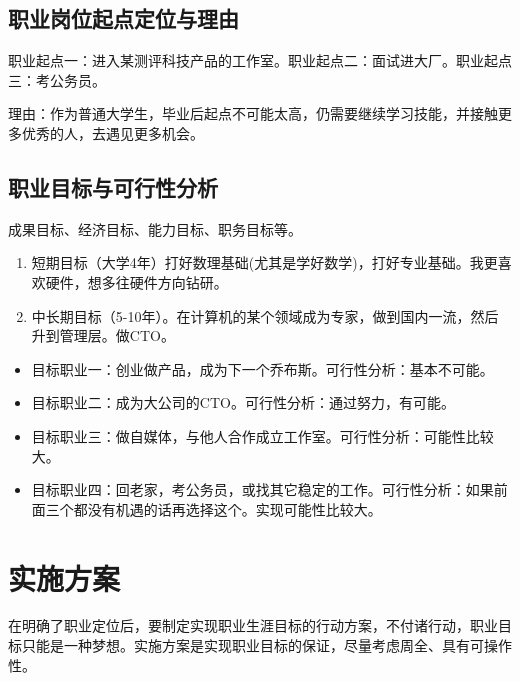 \documentclass{article}
\begin{document}
\subsection{职业岗位起点定位与理由}
职业起点一：进入某测评科技产品的工作室。职业起点二：面试进大厂。职业起点三：考公务员。\par
理由：作为普通大学生，毕业后起点不可能太高，仍需要继续学习技能，并接触更多优秀的人，去遇见更多机会。
\subsection{职业目标与可行性分析}

成果目标、经济目标、能力目标、职务目标等。
\begin{enumerate}[(1)]
	\item 短期目标（大学4年）打好数理基础(尤其是学好数学)，打好专业基础。我更喜欢硬件，想多往硬件方向钻研。
	\item 中长期目标（5-10年）。在计算机的某个领域成为专家，做到国内一流，然后升到管理层。做CTO。
\end{enumerate}
\begin{itemize}
    \item 目标职业一：创业做产品，成为下一个乔布斯。可行性分析：基本不可能。
    \item 目标职业二：成为大公司的CTO。可行性分析：通过努力，有可能。
    \item 目标职业三：做自媒体，与他人合作成立工作室。可行性分析：可能性比较大。
    \item 目标职业四：回老家，考公务员，或找其它稳定的工作。可行性分析：如果前面三个都没有机遇的话再选择这个。实现可能性比较大。
\end{itemize}


\section{实施方案}
在明确了职业定位后，要制定实现职业生涯目标的行动方案，不付诸行动，职业目标只能是一种梦想。实施方案是实现职业目标的保证，尽量考虑周全、具有可操作性。\par
\end{document}
